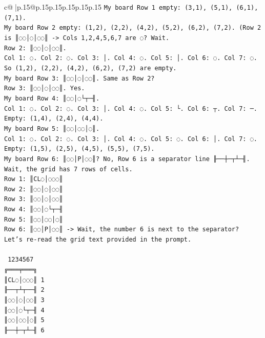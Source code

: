 \documentclass{article}
\begin{document}
{\begin{supertabular}{c@{$\;$}|p{.15\linewidth}@{}p{.15\linewidth}p{.15\linewidth}p{.15\linewidth}p{.15\linewidth}p{.15\linewidth}}
{{{\texttt{My board Row 1 empty: (3,1), (5,1), (6,1), (7,1).} \\
\texttt{My board Row 2 empty: (1,2), (2,2), (4,2), (5,2), (6,2), (7,2). (Row 2 is ║◌◌│◌│◌◌║ {-}> Cols 1,2,4,5,6,7 are ◌? Wait.} \\
\texttt{Row 2: ║◌◌│◌│◌◌║.} \\
\texttt{Col 1: ◌. Col 2: ◌. Col 3: │. Col 4: ◌. Col 5: │. Col 6: ◌. Col 7: ◌.} \\
\texttt{So (1,2), (2,2), (4,2), (6,2), (7,2) are empty.} \\
\texttt{My board Row 3: ║◌◌│◌│◌◌║. Same as Row 2?} \\
\texttt{Row 3: ║◌◌│◌│◌◌║. Yes.} \\
\texttt{My board Row 4: ║◌◌│◌└┬─╢.} \\
\texttt{Col 1: ◌. Col 2: ◌. Col 3: │. Col 4: ◌. Col 5: └. Col 6: ┬. Col 7: ─.} \\
\texttt{Empty: (1,4), (2,4), (4,4).} \\
\texttt{My board Row 5: ║◌◌│◌◌│◌║.} \\
\texttt{Col 1: ◌. Col 2: ◌. Col 3: │. Col 4: ◌. Col 5: ◌. Col 6: │. Col 7: ◌.} \\
\texttt{Empty: (1,5), (2,5), (4,5), (5,5), (7,5).} \\
\texttt{My board Row 6: ║◌◌│P│◌◌║? No, Row 6 is a separator line ╟──┼─┬┴─╢.} \\
\texttt{Wait, the grid has 7 rows of cells.} \\
\texttt{Row 1: ║CL◌│◌◌◌║} \\
\texttt{Row 2: ║◌◌│◌│◌◌║} \\
\texttt{Row 3: ║◌◌│◌│◌◌║} \\
\texttt{Row 4: ║◌◌│◌└┬─╢} \\
\texttt{Row 5: ║◌◌│◌◌│◌║} \\
\texttt{Row 6: ║◌◌│P│◌◌║ {-}> Wait, the number 6 is next to the separator?} \\
\texttt{Let's re{-}read the grid text provided in the prompt.} \\
\\ 
\texttt{ 1234567} \\
\texttt{╔═══╤═══╗} \\
\texttt{║CL◌│◌◌◌║ 1} \\
\texttt{╟──┬┴┬──╢ 2} \\
\texttt{║◌◌│◌│◌◌║ 3} \\
\texttt{║◌◌│◌└┬─╢ 4} \\
\texttt{║◌◌│◌◌│◌║ 5} \\
\texttt{╟──┼─┬┴─╢ 6} \\
}}}
\end{supertabular}}
\end{document}
